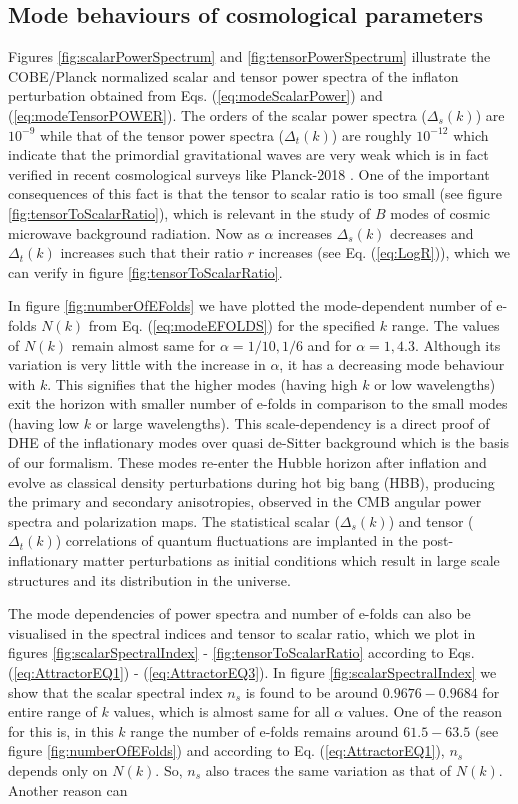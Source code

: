 \documentclass[a4paper,11pt]{article}
\begin{document}
    \subsection{Mode behaviours of cosmological parameters}
\label{subsec:ModeBehaviours}
Figures \ref{fig:scalarPowerSpectrum} and \ref{fig:tensorPowerSpectrum} illustrate the COBE/Planck normalized scalar and tensor power spectra of the inflaton perturbation obtained from Eqs. (\ref{eq:modeScalarPower}) and (\ref{eq:modeTensorPOWER}). The orders of the scalar power spectra ($\Delta_s(k)$) are $10^{-9}$ while that of the tensor power spectra ($\Delta_t(k)$) are roughly $10^{-12}$ which indicate that the primordial gravitational waves are very weak which is in fact verified in recent cosmological surveys like Planck-2018 \cite{Planck:2018jri,Planck:2018vyg}. One of the important consequences of this fact is that the tensor to scalar ratio is too small (see figure \ref{fig:tensorToScalarRatio}), which is relevant in the study of $B$ modes of cosmic microwave background radiation. Now as $\alpha$ increases $\Delta_s(k)$ decreases and $\Delta_t(k)$ increases such that their ratio $r$ increases (see Eq. (\ref{eq:LogR})), which we can verify in figure \ref{fig:tensorToScalarRatio}.\par In figure \ref{fig:numberOfEFolds} we have plotted the mode-dependent number of e-folds $N(k)$ from Eq. (\ref{eq:modeEFOLDS}) for the specified $k$ range. The values of $N(k)$ remain almost same for $\alpha=1/10,1/6$ and for $\alpha=1,4.3$. Although its variation is very little with the increase in $\alpha$, it has a decreasing mode behaviour with $k$. This signifies that the higher modes (having high $k$ or low wavelengths) exit the horizon with smaller number of e-folds in comparison to the small modes (having low $k$ or large wavelengths). This scale-dependency is a direct proof of DHE of the inflationary modes over quasi de-Sitter background which is the basis of our formalism. These modes re-enter the Hubble horizon after inflation and evolve as classical density perturbations during hot big bang (HBB), producing the primary and secondary anisotropies, observed in the CMB angular power spectra and polarization maps. The statistical scalar ($\Delta_s(k)$) and tensor ($\Delta_t(k)$) correlations of quantum fluctuations are implanted in the post-inflationary matter perturbations as initial conditions which result in large scale structures and its distribution in the universe.\par The mode dependencies of power spectra and number of e-folds can also be visualised in the spectral indices and tensor to scalar ratio, which we plot in figures \ref{fig:scalarSpectralIndex} - \ref{fig:tensorToScalarRatio} according to Eqs. (\ref{eq:AttractorEQ1}) - (\ref{eq:AttractorEQ3}). In figure \ref{fig:scalarSpectralIndex} we show that the scalar spectral index $n_s$ is found to be around $0.9676 - 0.9684$ for entire range of $k$ values, which is almost same for all $\alpha$ values. One of the reason for this is, in this $k$ range the number of e-folds remains around $61.5 - 63.5$ (see figure \ref{fig:numberOfEFolds}) and according to Eq. (\ref{eq:AttractorEQ1}), $n_s$ depends only on $N(k)$. So, $n_s$ also traces the same variation as that of $N(k)$. Another reason can 
\end{document}
